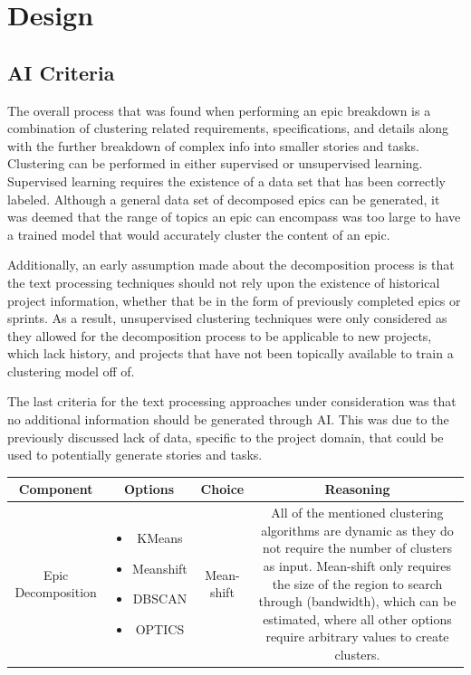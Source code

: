 \section{Design}

\subsection{AI Criteria}

\label{criteria}
The overall process that was found when performing an epic breakdown is a combination of clustering related requirements, specifications, and details along with the further breakdown of complex info into smaller stories and tasks. Clustering can be performed in either supervised or unsupervised learning. Supervised learning requires the existence of a data set that has been correctly labeled. Although a general data set of decomposed epics can be generated, it was deemed that the range of topics an epic can encompass was too large to have a trained model that would accurately cluster the content of an epic. 

Additionally, an early assumption made about the decomposition process is that the text processing techniques should not rely upon the existence of historical project information, whether that be in the form of previously completed epics or sprints. As a result, unsupervised clustering techniques were only considered as they allowed for the decomposition process to be applicable to new projects, which lack history, and projects that have not been topically available to train a clustering model off of.

The last criteria for the text processing approaches under consideration was that no additional information should be generated through AI. This was due to the previously discussed lack of data, specific to the project domain, that could be used to potentially generate stories and tasks.

\begin{table}
\begin{tabularx}{\textwidth}{|c|c|c|c|}
\hline
Component & Options & Choice & Reasoning \\
\hline
Epic Decomposition & 
\begin{itemize}
\item KMeans
\item Meanshift
\item DBSCAN
\item OPTICS
\end{itemize} &
Mean-shift & All of the mentioned clustering algorithms are dynamic as they do not require the number of clusters as input. Mean-shift only requires the size of the region to search through (bandwidth), which can be estimated, where all other options require arbitrary values to create clusters.\\
\hline
\end{tabularx}
\end{table}

